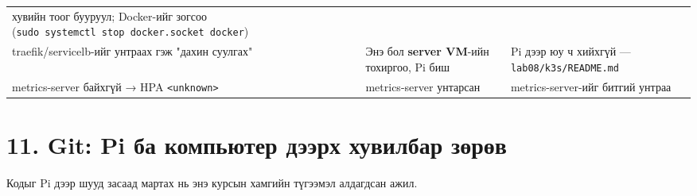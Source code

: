 \begin{longtable}[]{@{}lll@{}}
\begin{minipage}[t]{0.30\columnwidth}
хувийн тоог бууруул; Docker-ийг зогсоо (\texttt{sudo\ systemctl\ stop\ docker.\allowbreak{}socket\ docker})\strut
\end{minipage}\tabularnewline
\begin{minipage}[t]{0.30\columnwidth}\raggedright
traefik/servicelb-ийг унтраах гэж "дахин суулгах"\strut
\end{minipage} & \begin{minipage}[t]{0.30\columnwidth}\raggedright
Энэ бол \textbf{server VM}-ийн тохиргоо, Pi биш\strut
\end{minipage} & \begin{minipage}[t]{0.30\columnwidth}\raggedright
Pi дээр юу ч хийхгүй --- \texttt{lab08/\allowbreak{}k3s/\allowbreak{}README.\allowbreak{}md}\strut
\end{minipage}\tabularnewline
\begin{minipage}[t]{0.30\columnwidth}\raggedright
metrics-server байхгүй → HPA \texttt{\textless{}unknown\textgreater{}}\strut
\end{minipage} & \begin{minipage}[t]{0.30\columnwidth}\raggedright
metrics-server унтарсан\strut
\end{minipage} & \begin{minipage}[t]{0.30\columnwidth}\raggedright
metrics-server-ийг битгий унтраа\strut
\end{minipage}\tabularnewline
\bottomrule
\end{longtable}\endgroup

\hypertarget{git-pi-ux431ux430-ux43aux43eux43cux43fux44cux44eux442ux435ux440-ux434ux44dux44dux440ux445-ux445ux443ux432ux438ux43bux431ux430ux440-ux437ux4e9ux440ux4e9ux432}{%
\section{11. Git: Pi ба компьютер дээрх хувилбар зөрөв}\label{git-pi-ux431ux430-ux43aux43eux43cux43fux44cux44eux442ux435ux440-ux434ux44dux44dux440ux445-ux445ux443ux432ux438ux43bux431ux430ux440-ux437ux4e9ux440ux4e9ux432}}

Кодыг Pi дээр шууд засаад мартах нь энэ курсын хамгийн түгээмэл алдагдсан ажил.

\begin{Shaded}
\begin{Highlighting}[]
\KeywordTok{\&\&}  \KeywordTok{\&\&} 

\end{Highlighting}
\end{Shaded}

